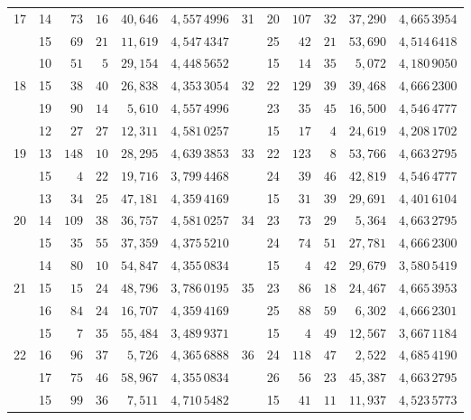 \begin{center}
\begin{tabular}{|c|c|r@{\;}r@{\;}r|c||c|c|r@{\;}r@{\;}r|c|}
17 & 14 & $73$ & $16$ & $40{,}646$ & $4{,}557\,4996$ & 31 & 20 & $107$ & $32$ & $37{,}290$ & $4{,}665\,3954$\\
 & 15 & $69$ & $21$ & $11{,}619$ & $4{,}547\,4347$ &  & 25 & $42$ & $21$ & $53{,}690$ & $4{,}514\,6418$\\[3pt]
 & 10 & $51$ & $5$ & $29{,}154$ & $4{,}448\,5652$ &  & 15 & $14$ & $35$ & $5{,}072$ & $4{,}180\,9050$\\
18 & 15 & $38$ & $40$ & $26{,}838$ & $4{,}353\,3054$ & 32 & 22 & $129$ & $39$ & $39{,}468$ & $4{,}666\,2300$\\
 & 19 & $90$ & $14$ & $5{,}610$ & $4{,}557\,4996$ &  & 23 & $35$ & $45$ & $16{,}500$ & $4{,}546\,4777$\\[3pt]
 & 12 & $27$ & $27$ & $12{,}311$ & $4{,}581\,0257$ &  & 15 & $17$ & $4$ & $24{,}619$ & $4{,}208\,1702$\\
19 & 13 & $148$ & $10$ & $28{,}295$ & $4{,}639\,3853$ & 33 & 22 & $123$ & $8$ & $53{,}766$ & $4{,}663\,2795$\\
 & 15 & $4$ & $22$ & $19{,}716$ & $3{,}799\,4468$ &  & 24 & $39$ & $46$ & $42{,}819$ & $4{,}546\,4777$\\[3pt]
 & 13 & $34$ & $25$ & $47{,}181$ & $4{,}359\,4169$ &  & 15 & $31$ & $39$ & $29{,}691$ & $4{,}401\,6104$\\
20 & 14 & $109$ & $38$ & $36{,}757$ & $4{,}581\,0257$ & 34 & 23 & $73$ & $29$ & $5{,}364$ & $4{,}663\,2795$\\
 & 15 & $35$ & $55$ & $37{,}359$ & $4{,}375\,5210$ &  & 24 & $74$ & $51$ & $27{,}781$ & $4{,}666\,2300$\\[3pt]
 & 14 & $80$ & $10$ & $54{,}847$ & $4{,}355\,0834$ &  & 15 & $4$ & $42$ & $29{,}679$ & $3{,}580\,5419$\\
21 & 15 & $15$ & $24$ & $48{,}796$ & $3{,}786\,0195$ & 35 & 23 & $86$ & $18$ & $24{,}467$ & $4{,}665\,3953$\\
 & 16 & $84$ & $24$ & $16{,}707$ & $4{,}359\,4169$ &  & 25 & $88$ & $59$ & $6{,}302$ & $4{,}666\,2301$\\[3pt]
 & 15 & $7$ & $35$ & $55{,}484$ & $3{,}489\,9371$ &  & 15 & $4$ & $49$ & $12{,}567$ & $3{,}667\,1184$\\
22 & 16 & $96$ & $37$ & $5{,}726$ & $4{,}365\,6888$ & 36 & 24 & $118$ & $47$ & $2{,}522$ & $4{,}685\,4190$\\
 & 17 & $75$ & $46$ & $58{,}967$ & $4{,}355\,0834$ &  & 26 & $56$ & $23$ & $45{,}387$ & $4{,}663\,2795$\\[3pt]
 & 15 & $99$ & $36$ & $7{,}511$ & $4{,}710\,5482$ &  & 15 & $41$ & $11$ & $11{,}937$ & $4{,}523\,5773$\\

\end{tabular}
\end{center}
